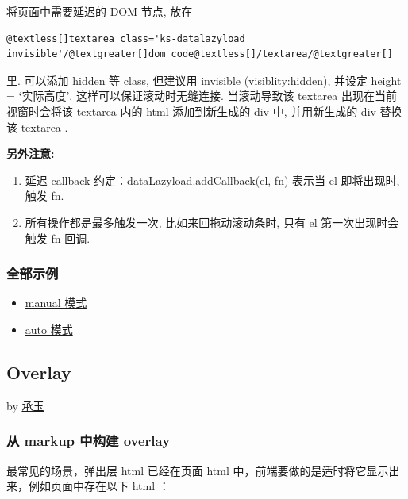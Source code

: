 \documentclass[letterpaper,10pt,english]{sphinxmanual}
\begin{document}
将页面中需要延迟的 DOM 节点, 放在

\begin{Verbatim}[commandchars=@\[\]]
@textless[]textarea class='ks-datalazyload invisible'/@textgreater[]dom code@textless[]/textarea/@textgreater[]
\end{Verbatim}

里. 可以添加 hidden 等 class, 但建议用 invisible (visiblity:hidden), 并设定 height = `实际高度', 这样可以保证滚动时无缝连接.
当滚动导致该 textarea 出现在当前视窗时会将该 textarea 内的 html 添加到新生成的 div 中, 并用新生成的 div 替换该 textarea .

\textbf{另外注意:}
\begin{enumerate}
\item {}
延迟 callback 约定：dataLazyload.addCallback(el, fn) 表示当 el 即将出现时, 触发 fn.

\item {}
所有操作都是最多触发一次, 比如来回拖动滚动条时, 只有 el 第一次出现时会触发 fn 回调.

\end{enumerate}


\subsubsection{全部示例}
\label{demo/component/datalazyload/index:id4}\begin{itemize}
\item {}
\href{http://docs.kissyui.com/kissy/src/datalazyload/test.html}{manual 模式}

\item {}
\href{http://docs.kissyui.com/kissy/src/datalazyload/test-auto.html}{auto 模式}

\end{itemize}


\subsection{Overlay}
\label{demo/component/overlay/index::doc}\label{demo/component/overlay/index:overlay}
by \href{mailto:yiminghe@gmail.com}{承玉}


\subsubsection{从 markup 中构建 overlay}
\label{demo/component/overlay/index:markup-overlay}
最常见的场景，弹出层 html 已经在页面 html 中，前端要做的是适时将它显示出来，例如页面中存在以下 html ：
\end{document}
